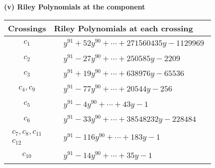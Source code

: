 \documentclass[1p]{elsarticle_modified}
\theoremstyle{definition}
\begin{document}
\newpage\renewcommand{\arraystretch}{1}
\flushleft \textbf{(v) Riley Polynomials at the component}\newline \\
\begin{tabular}{m{50pt}|m{274pt}}
Crossings & \hspace{64pt}Riley Polynomials at each crossing \\
\hline $$\begin{aligned}c_{1}\end{aligned}$$&$\begin{aligned}
&y^{91}+52 y^{90}+\cdots+271560435 y-1129969
\end{aligned}$\\
\hline $$\begin{aligned}c_{2}\end{aligned}$$&$\begin{aligned}
&y^{91}-27 y^{90}+\cdots+250585 y-2209
\end{aligned}$\\
\hline $$\begin{aligned}c_{3}\end{aligned}$$&$\begin{aligned}
&y^{91}+19 y^{90}+\cdots+638976 y-65536
\end{aligned}$\\
\hline $$\begin{aligned}c_{4},c_{9}\end{aligned}$$&$\begin{aligned}
&y^{91}-77 y^{90}+\cdots+20544 y-256
\end{aligned}$\\
\hline $$\begin{aligned}c_{5}\end{aligned}$$&$\begin{aligned}
&y^{91}-4 y^{90}+\cdots+43 y-1
\end{aligned}$\\
\hline $$\begin{aligned}c_{6}\end{aligned}$$&$\begin{aligned}
&y^{91}-33 y^{90}+\cdots+38548232 y-228484
\end{aligned}$\\
\hline $$\begin{aligned}c_{7},c_{8},c_{11}\\c_{12}\end{aligned}$$&$\begin{aligned}
&y^{91}-116 y^{90}+\cdots+183 y-1
\end{aligned}$\\
\hline $$\begin{aligned}c_{10}\end{aligned}$$&$\begin{aligned}
&y^{91}-14 y^{90}+\cdots+35 y-1
\end{aligned}$\\
\hline
\end{tabular}\\~\\
\end{document}
